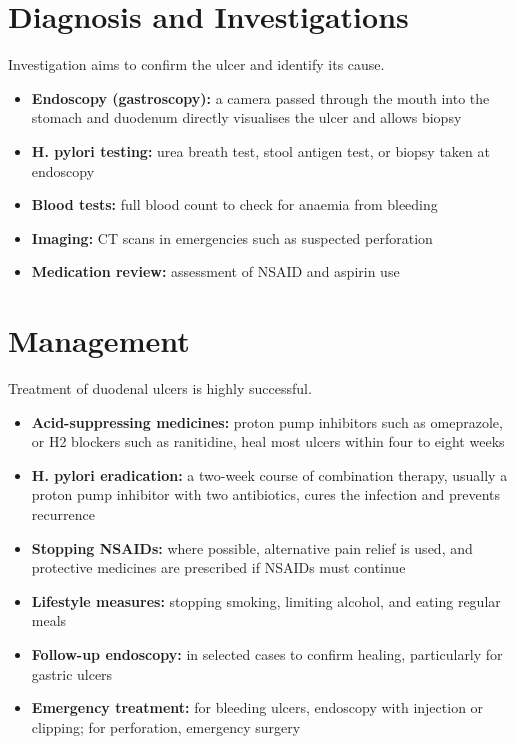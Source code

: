 \section*{Diagnosis and Investigations}
Investigation aims to confirm the ulcer and identify its cause.
\begin{itemize}
    \item \textbf{Endoscopy (gastroscopy):} a camera passed through the mouth into the stomach and duodenum directly visualises the ulcer and allows biopsy
    \item \textbf{H. pylori testing:} urea breath test, stool antigen test, or biopsy taken at endoscopy
    \item \textbf{Blood tests:} full blood count to check for anaemia from bleeding
    \item \textbf{Imaging:} CT scans in emergencies such as suspected perforation
    \item \textbf{Medication review:} assessment of NSAID and aspirin use
\end{itemize}

\section*{Management}
Treatment of duodenal ulcers is highly successful.
\begin{itemize}
    \item \textbf{Acid-suppressing medicines:} proton pump inhibitors such as omeprazole, or H2 blockers such as ranitidine, heal most ulcers within four to eight weeks
    \item \textbf{H. pylori eradication:} a two-week course of combination therapy, usually a proton pump inhibitor with two antibiotics, cures the infection and prevents recurrence
    \item \textbf{Stopping NSAIDs:} where possible, alternative pain relief is used, and protective medicines are prescribed if NSAIDs must continue
    \item \textbf{Lifestyle measures:} stopping smoking, limiting alcohol, and eating regular meals
    \item \textbf{Follow-up endoscopy:} in selected cases to confirm healing, particularly for gastric ulcers
    \item \textbf{Emergency treatment:} for bleeding ulcers, endoscopy with injection or clipping; for perforation, emergency surgery
\end{itemize}

